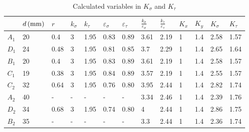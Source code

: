 \begin{table}[ht]
	\begin{tabular}{|l|l|l|l|l|l|l|l|l|l|l|l|l|}
		\hline
		\rowcolor[HTML]{C0C0C0} 
		&
		$d\, (\mathrm{mm})$ &
		$r$ &
		$k_\sigma$ &
		$k_\tau$ &
		$\varepsilon_\sigma$ &
		$\varepsilon_\tau$ &
		$\frac{k_\sigma}{\varepsilon_\sigma}$ &
		$\frac{k_\tau}{\varepsilon_\tau}$ &
		$K_x$ &
		$K_y$ &
		$K_\sigma$ &
		$K_\tau$ \\ \hline
		\cellcolor[HTML]{C0C0C0}$A_1$ & 20 & 0.4  & 3 & 1.95 & 0.83 & 0.89 & 3.61 & 2.19 & 1 & 1.4 & 2.58 & 1.57 \\ \hline
		\cellcolor[HTML]{C0C0C0}$D_1$ & 24 & 0.48 & 3 & 1.95 & 0.81 & 0.85 & 3.7  & 2.29 & 1 & 1.4 & 2.65 & 1.64 \\ \hline
		\cellcolor[HTML]{C0C0C0}$B_1$ & 20 & 0.4  & 3 & 1.95 & 0.83 & 0.89 & 3.61 & 2.19 & 1 & 1.4 & 2.58 & 1.57 \\ \hline
		\cellcolor[HTML]{C0C0C0}$C_1$ & 19 & 0.38 & 3 & 1.95 & 0.84 & 0.89 & 3.57 & 2.19 & 1 & 1.4 & 2.55 & 1.57 \\ \hline
		\cellcolor[HTML]{C0C0C0}$C_2$ & 32 & 0.64 & 3 & 1.95 & 0.76 & 0.80 & 3.95 & 2.44 & 1 & 1.4 & 2.82 & 1.74 \\ \hline
		\cellcolor[HTML]{C0C0C0}$A_2$ & 40 & -    & - & -    & -    & -    & 3.34 & 2.46 & 1 & 1.4 & 2.39 & 1.76 \\ \hline
		\cellcolor[HTML]{C0C0C0}$D_2$ & 34 & 0.68 & 3 & 1.95 & 0.74 & 0.80 & 4 & 2.44 & 1 & 1.4 & 2.86 & 1.75 \\ \hline
		\cellcolor[HTML]{C0C0C0}$B_2$ & 35 & -    & - & -    & -    & -    & 3.3  & 2.44 & 1 & 1.4 & 2.36 & 1.74 \\ \hline
	\end{tabular}
	\caption{Calculated variables in $ K_\sigma $ and $ K_\tau $}
\end{table}
